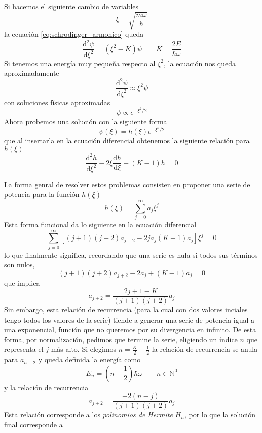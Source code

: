 Si hacemos el siguiente cambio de variables
\begin{equation}
    \xi = \sqrt{\frac{m \omega}{\hbar}} 
\end{equation}
la ecuación \ref{eq:schrodinger_armonico} queda 
\begin{equation}
    \frac{\mathrm{d}^2\psi}{\mathrm{d}\xi^2} = (\xi^2  - K) \psi  \qquad K = \frac{2 E}{\hbar \omega}
\end{equation}
Si tenemos una energía muy pequeña respecto al $\xi^2$, la ecuación nos queda aproximadamente
\[  \frac{\mathrm{d}^2\psi}{\mathrm{d}\xi^2} \approx \xi^2 \psi \] 
con soluciones físicas aproximadas
\[ \psi \propto e^{-\xi^2/2} \]
Ahora probemos una solución con la siguiente forma
\begin{equation}
    \psi(\xi) = h(\xi) e^{-\xi^2/2}
\end{equation}
que al insertarla en la ecuación diferencial obtenemos la siguiente relación para $h(\xi)$
\begin{equation}
    \frac{\mathrm{d}^2 h}{\mathrm{d} \xi^2} - 2 \xi \frac{\mathrm{d} h}{\mathrm{d}\xi} + (K - 1) h = 0
\end{equation}

La forma genral de resolver estos problemas consisten en proponer una serie de potencia para la función $h(\xi)$
\[ h(\xi) = \sum_{j = 0}^{\infty} a_j \xi^j \]
Esta forma funcional da lo siguiente en la ecuación diferencial
\begin{equation}
    \sum_{j = 0}^{\infty} [(j + 1) (j + 2) a_{j + 2} - 2 j a_j (K - 1) a_j] \xi^j = 0
\end{equation}
lo que finalmente significa, recordando que una serie es nula si todos sus términos son nulos,
\[(j + 1)(j + 2) a_{j + 2} - 2 a_j + (K - 1) a_j = 0 \]
que implica
\begin{equation}
    a_{j + 2} = \frac{ 2j + 1 - K}{(j + 1) (j + 2)} a_j
\end{equation}
Sin embargo, esta relación de recurrencia (para la cual con dos valores inciales tengo todos los valores de la serie) tiende a generar una serie de potencia igual a una exponencial, función que no queremos por su divergencia en infinito.
De esta forma, por normalización, pedimos que termine la serie, eligiendo un índice $n$ que representa el $j$ más alto.
Si elegimos $n = \frac{K}{2} - \frac{1}{2}$ la relación de recurrencia se anula para $a_{n + 2}$ y queda definida la energía como
\begin{equation}
    E_n = \left( n + \frac{1}{2}\right)\hbar \omega \qquad n \in \mathbb{N}^0
\end{equation}
y la relación de recurrencia
\begin{equation}
    a_{j + 2} = \frac{-2(n - j)}{(j + 1) (j + 2)} a_j
\end{equation}
Esta relación corresponde a los \emph{polinomios de Hermite} $H_n$, por lo que la solución final corresponde a

